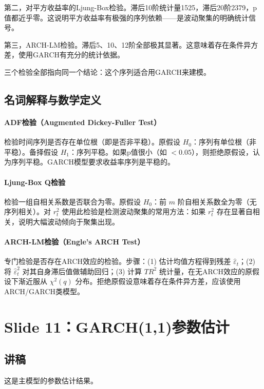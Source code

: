 \documentclass[11pt,a4paper]{article}
\begin{document}
第二，对平方收益率的Ljung-Box检验。滞后10阶统计量1525，滞后20阶2379，p值都近乎零。这说明平方收益率有极强的序列依赖——是波动聚集的明确统计信号。

第三，ARCH-LM检验。滞后5、10、12阶全部极其显著。这意味着存在条件异方差，使用GARCH有充分的统计依据。

三个检验全部指向同一个结论：这个序列适合用GARCH来建模。

\subsection*{名词解释与数学定义}

\paragraph{ADF检验（Augmented Dickey-Fuller Test）} 检验时间序列是否存在单位根（即是否非平稳）。原假设 \(H_0\)：序列有单位根（非平稳）。备择假设 \(H_1\)：序列平稳。如果p值很小（如 \(<0.05\)），则拒绝原假设，认为序列平稳。GARCH模型要求收益率序列是平稳的。

\paragraph{Ljung-Box Q检验} 检验一组自相关系数是否联合为零。原假设 \(H_0\)：前 \(m\) 阶自相关系数全为零（无序列相关）。对 \(r_t^2\) 使用此检验是检测波动聚集的常用方法：如果 \(r_t^2\) 存在显著自相关，说明大幅波动倾向于聚集出现。

\paragraph{ARCH-LM检验（Engle's ARCH Test）} 专门检验是否存在ARCH效应的检验。步骤：(1) 估计均值方程得到残差 \(\hat{\varepsilon}_t\)；(2) 将 \(\hat{\varepsilon}_t^2\) 对其自身滞后值做辅助回归；(3) 计算 \(TR^2\) 统计量，在无ARCH效应的原假设下渐近服从 \(\chi^2(q)\) 分布。拒绝原假设意味着存在条件异方差，应该使用ARCH/GARCH类模型。

\newpage
\section*{Slide 11：GARCH(1,1)参数估计}

\subsection*{讲稿}
这是主模型的参数估计结果。
\end{document}
